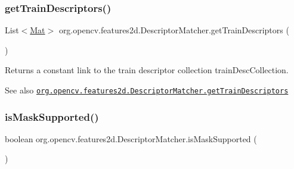 \mbox{\label{classorg_1_1opencv_1_1features2d_1_1_descriptor_matcher_aeb2d3f129adc9afcb18a318d8f9464ea}} 
\subsubsection{\texorpdfstring{get\+Train\+Descriptors()}{getTrainDescriptors()}}
{\footnotesize\ttfamily List$<$\mbox{\hyperlink{classorg_1_1opencv_1_1core_1_1_mat}{Mat}}$>$ org.\+opencv.\+features2d.\+Descriptor\+Matcher.\+get\+Train\+Descriptors (\begin{DoxyParamCaption}{ }\end{DoxyParamCaption})}

Returns a constant link to the train descriptor collection {\ttfamily train\+Desc\+Collection}.

\begin{DoxySeeAlso}{See also}
\href{http://docs.opencv.org/modules/features2d/doc/common_interfaces_of_descriptor_matchers.html#descriptormatcher-gettraindescriptors}{\tt org.\+opencv.\+features2d.\+Descriptor\+Matcher.\+get\+Train\+Descriptors} 
\end{DoxySeeAlso}
\mbox{\label{classorg_1_1opencv_1_1features2d_1_1_descriptor_matcher_a33fddc130bf7d2458fcec231490322e2}} 
\subsubsection{\texorpdfstring{is\+Mask\+Supported()}{isMaskSupported()}}
{\footnotesize\ttfamily boolean org.\+opencv.\+features2d.\+Descriptor\+Matcher.\+is\+Mask\+Supported (\begin{DoxyParamCaption}{ }\end{DoxyParamCaption})}


